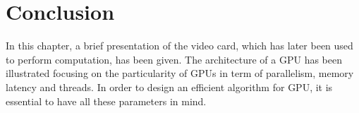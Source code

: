  \section{Conclusion}

In this chapter,  a brief presentation of the video card,  which has later been
used to perform computation, has been  given. The architecture of a GPU has been
illustrated focusing on the particularity of GPUs in term of parallelism, memory
latency and  threads. In order to design  an efficient algorithm for  GPU, it is
essential to have all these parameters in mind.



